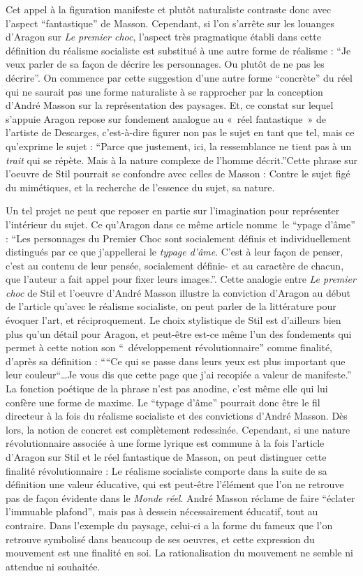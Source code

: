  Cet appel à la figuration manifeste et plutôt naturaliste contraste donc avec l’aspect \enquote{fantastique} de Masson. Cependant, si l’on s’arrête sur les louanges d’Aragon sur \emph{Le premier choc}, l’aspect très pragmatique établi dans cette définition du réalisme socialiste est substitué à une autre forme de réalisme : \enquote{Je veux parler de sa façon de décrire les personnages. Ou plutôt de ne pas les décrire}. On commence par cette suggestion d’une autre forme \enquote{concrète} du réel qui ne saurait pas une forme naturaliste à se rapprocher par la conception d’André Masson sur la représentation des paysages. Et, ce constat sur lequel s’appuie Aragon repose sur fondement analogue au « réel fantastique » de l’artiste de Descarges, c’est-à-dire figurer non pas le sujet en tant que tel, mais ce qu’exprime le sujet : \enquote{Parce que justement, ici, la ressemblance ne tient  pas à un \emph{trait} qui se répète. Mais à la nature complexe de l’homme décrit.}Cette phrase sur l’oeuvre de Stil pourrait se confondre avec celles de Masson : Contre le sujet figé du mimétiques, et la recherche de l’essence du sujet, sa nature. 

	Un tel projet ne peut que reposer en partie sur l’imagination pour représenter l’intérieur du sujet. Ce qu’Aragon dans ce même article nomme le \enquote{ypage d’âme} : \enquote{Les personnages du Premier Choc sont socialement définis et individuellement distingués par ce que j’appellerai le \emph{typage d’âme}. C’est à leur façon de penser, c’est au contenu de leur pensée, socialement définie- et au caractère de chacun, que l’auteur a fait appel pour fixer leurs images.}. Cette analogie entre \emph{Le premier choc} de Stil et l’oeuvre d’André Masson illustre la conviction d’Aragon au début de l’article qu’avec le réalisme socialiste, on peut parler de la littérature pour évoquer l’art, et réciproquement.  Le choix stylistique de Stil est d’ailleurs bien plus qu’un détail pour Aragon, et peut-être est-ce même l’un des fondements qui permet à cette notion son \enquote{ développement révolutionnaire} comme finalité, d’après sa définition : \enquote{“Ce qui se passe dans leurs yeux est plus important que leur couleur“…Je vous dis que cette page que j’ai recopiée a valeur de manifeste.} La fonction poétique de la phrase n’est pas anodine, c’est même elle qui lui confère une forme de maxime. Le \enquote{typage d’âme} pourrait donc être le fil directeur à la fois du réalisme socialiste et des convictions d’André Masson. Dès lors, la notion de concret est complètement redessinée. Cependant, si une nature révolutionnaire associée à une forme lyrique est commune à la fois l’article d’Aragon sur Stil et le réel fantastique de Masson, on peut distinguer cette finalité révolutionnaire : Le réalisme socialiste comporte dans la suite de sa définition une valeur éducative, qui est peut-être l’élément que l’on ne retrouve pas de façon évidente dans le \emph{Monde réel}. André Masson réclame de faire \enquote{éclater l’immuable plafond}, mais pas à dessein nécessairement éducatif, tout au contraire. Dans l’exemple du paysage, celui-ci a la forme du fameux que l’on retrouve symbolisé dans beaucoup de ses oeuvres, et cette expression du mouvement est une finalité en soi. La rationalisation du mouvement ne semble ni attendue ni souhaitée. 


